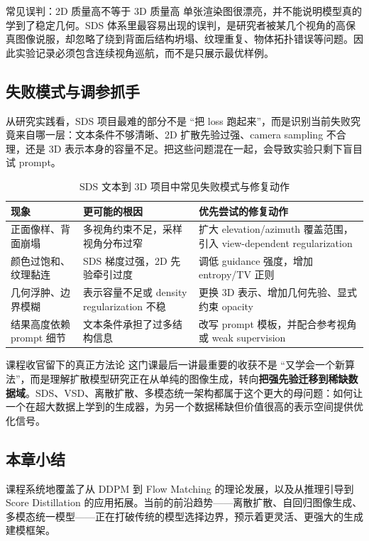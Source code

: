 \begin{warningbox}{常见误判：2D 质量高不等于 3D 质量高}
单张渲染图很漂亮，并不能说明模型真的学到了稳定几何。SDS 体系里最容易出现的误判，是研究者被某几个视角的高保真图像说服，却忽略了绕到背面后结构坍塌、纹理重复、物体拓扑错误等问题。因此实验记录必须包含连续视角巡航，而不是只展示最优样例。
\end{warningbox}

\subsection{失败模式与调参抓手}

从研究实践看，SDS 项目最难的部分不是 ``把 loss 跑起来''，而是识别当前失败究竟来自哪一层：文本条件不够清晰、2D 扩散先验过强、camera sampling 不合理，还是 3D 表示本身的容量不足。把这些问题混在一起，会导致实验只剩下盲目试 prompt。

\begin{table}[H]
\centering
\begin{tabular}{p{} p{} p{}}
\toprule
现象 & 更可能的根因 & 优先尝试的修复动作 \\
\midrule
正面像样、背面崩塌 & 多视角约束不足，采样视角分布过窄 & 扩大 elevation/azimuth 覆盖范围，引入 view-dependent regularization \\
颜色过饱和、纹理黏连 & SDS 梯度过强，2D 先验牵引过度 & 调低 guidance 强度，增加 entropy/TV 正则 \\
几何浮肿、边界模糊 & 表示容量不足或 density regularization 不稳 & 更换 3D 表示、增加几何先验、显式约束 opacity \\
结果高度依赖 prompt 细节 & 文本条件承担了过多结构信息 & 改写 prompt 模板，并配合参考视角或 weak supervision \\
\bottomrule
\end{tabular}
\caption{SDS 文本到 3D 项目中常见失败模式与修复动作}
\end{table}

\begin{importantbox}{课程收官留下的真正方法论}
这门课最后一讲最重要的收获不是 ``又学会一个新算法''，而是理解扩散模型研究正在从单纯的图像生成，转向\textbf{把强先验迁移到稀缺数据域}。SDS、VSD、离散扩散、多模态统一架构都属于这个更大的母问题：如何让一个在超大数据上学到的生成器，为另一个数据稀缺但价值很高的表示空间提供优化信号。
\end{importantbox}

\subsection{本章小结}

课程系统地覆盖了从 DDPM 到 Flow Matching 的理论发展，以及从推理引导到 Score Distillation 的应用拓展。当前的前沿趋势——离散扩散、自回归图像生成、多模态统一模型——正在打破传统的模型选择边界，预示着更灵活、更强大的生成建模框架。

\newpage
